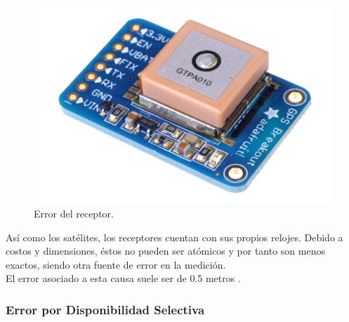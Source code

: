 \begin{figure}[H]
\centering
\includegraphics[scale=0.9]{Figures/disp}
\caption[Error del receptor.]{Error del receptor\footnotemark.}
\label{fig:ErrRec}
\end{figure}


Así como los satélites, los receptores cuentan con sus propios relojes. Debido a costos y dimensiones, éstos no pueden ser atómicos y por tanto son menos exactos, siendo otra fuente de error en la medición.\\

El error asociado a esta causa suele ser de 0.5 metros \citep{fallas2002sistema}.

\subsubsection{Error por Disponibilidad Selectiva}

